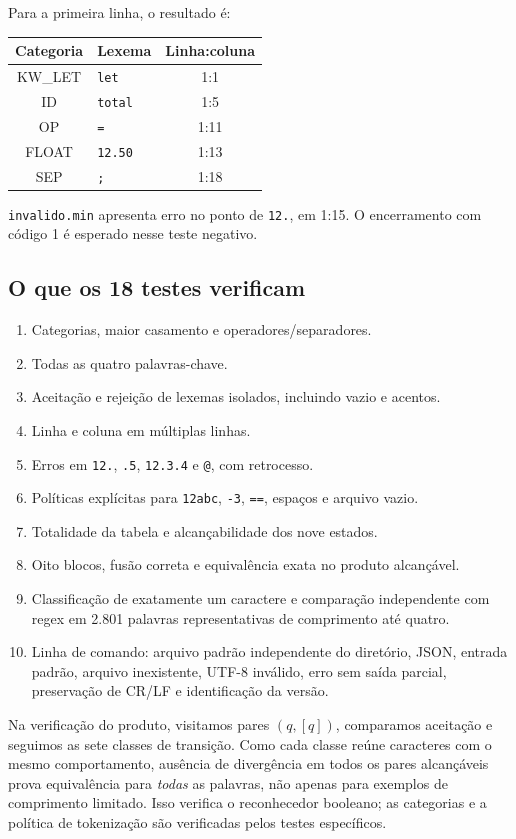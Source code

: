 \documentclass[12pt,a4paper]{article}
\begin{document}
Para a primeira linha, o resultado é:
\begin{center}
\begin{tabular}{clc}
\toprule Categoria & Lexema & Linha:coluna\\\midrule
KW\_LET & \texttt{let} & 1:1\\
ID & \texttt{total} & 1:5\\
OP & \texttt{=} & 1:11\\
FLOAT & \texttt{12.50} & 1:13\\
SEP & \texttt{;} & 1:18\\\bottomrule
\end{tabular}\end{center}
\texttt{invalido.min} apresenta erro no ponto de \texttt{12.}, em 1:15. O
encerramento com código 1 é esperado nesse teste negativo.

\subsection{O que os 18 testes verificam}
\begin{enumerate}
\item Categorias, maior casamento e operadores/separadores.
\item Todas as quatro palavras-chave.
\item Aceitação e rejeição de lexemas isolados, incluindo vazio e acentos.
\item Linha e coluna em múltiplas linhas.
\item Erros em \texttt{12.}, \texttt{.5}, \texttt{12.3.4} e \texttt{@}, com retrocesso.
\item Políticas explícitas para \texttt{12abc}, \texttt{-3}, \texttt{==}, espaços e arquivo vazio.
\item Totalidade da tabela e alcançabilidade dos nove estados.
\item Oito blocos, fusão correta e equivalência exata no produto alcançável.
\item Classificação de exatamente um caractere e comparação independente
com regex em 2.801 palavras representativas de comprimento até quatro.
\item Linha de comando: arquivo padrão independente do diretório, JSON,
entrada padrão, arquivo inexistente, UTF-8 inválido, erro sem saída parcial,
preservação de CR/LF e identificação da versão.
\end{enumerate}
Na verificação do produto, visitamos pares $(q,[q])$, comparamos aceitação e
seguimos as sete classes de transição. Como cada classe reúne caracteres com
o mesmo comportamento, ausência de divergência em todos os pares alcançáveis
prova equivalência para \emph{todas} as palavras, não apenas para exemplos de
comprimento limitado. Isso verifica o reconhecedor booleano; as categorias e a
política de tokenização são verificadas pelos testes específicos.
\end{document}
